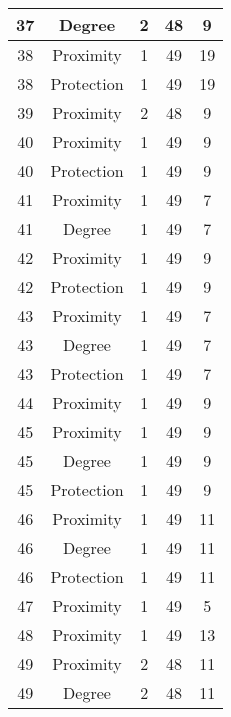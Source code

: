 \documentclass[results.tex]{subfiles}
\begin{document}
\begin{center}
\begin{tabular}{| c || c | c | c | c |}
    \hline
    37 & Degree & 2 & 48 & 9 \\ 
    \hline
    38 & Proximity & 1 & 49 & 19 \\ 
    \hline
    38 & Protection & 1 & 49 & 19 \\ 
    \hline
    39 & Proximity & 2 & 48 & 9 \\ 
    \hline
    40 & Proximity & 1 & 49 & 9 \\ 
    \hline
    40 & Protection & 1 & 49 & 9 \\ 
    \hline
    41 & Proximity & 1 & 49 & 7 \\ 
    \hline
    41 & Degree & 1 & 49 & 7 \\ 
    \hline
    42 & Proximity & 1 & 49 & 9 \\ 
    \hline
    42 & Protection & 1 & 49 & 9 \\ 
    \hline
    43 & Proximity & 1 & 49 & 7 \\ 
    \hline
    43 & Degree & 1 & 49 & 7 \\ 
    \hline
    43 & Protection & 1 & 49 & 7 \\ 
    \hline
    44 & Proximity & 1 & 49 & 9 \\ 
    \hline
    45 & Proximity & 1 & 49 & 9 \\ 
    \hline
    45 & Degree & 1 & 49 & 9 \\ 
    \hline
    45 & Protection & 1 & 49 & 9 \\ 
    \hline
    46 & Proximity & 1 & 49 & 11 \\ 
    \hline
    46 & Degree & 1 & 49 & 11 \\ 
    \hline
    46 & Protection & 1 & 49 & 11 \\ 
    \hline
    47 & Proximity & 1 & 49 & 5 \\ 
    \hline
    48 & Proximity & 1 & 49 & 13 \\ 
    \hline
    49 & Proximity & 2 & 48 & 11 \\ 
    \hline
    49 & Degree & 2 & 48 & 11 \\ 
    \hline   \end{tabular}
\end{center}
\end{document}
